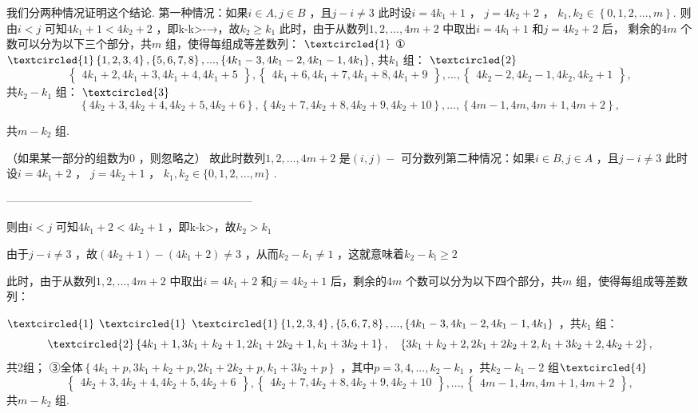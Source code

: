 \begin{question}
{我们分两种情况证明这个结论. 第一种情况：如果$i\in A,j\in B$ ，且$j-i\neq3$ 此时设$i=4k_{1}+1$ ， $j=4k_{2}+2$ ， $k_1,k_2\in\left\{0,1,2,...,m\right\}.$ 则由$i<j$ 可知$4k_{1}+1<4k_{2}+2$ ，即k-k>-→，故$k_2\geq k_1$ 此时，由于从数列$1,2,...,4m+2$ 中取出$i=4k_{\mathrm{l}}+1$ 和$j=4k_{2}+2$ 后， 剩余的$4m$ 个数可以分为以下三个部分，共$m$ 组，使得每组成等差数列： $\textcircled{1}$ ① $\textcircled{1}\left\{1,2,3,4\right\},\left\{5,6,7,8\right\},...,\left\{4k_{1}-3,4k_{1}-2,4k_{1}-1,4k_{1}\right\}$, 共$k_1$ 组： $\textcircled{2}$
$$\begin{Bmatrix}4k_1+2,4k_1+3,4k_1+4,4k_1+5\end{Bmatrix},\begin{Bmatrix}4k_1+6,4k_1+7,4k_1+8,4k_1+9\end{Bmatrix},...,\begin{Bmatrix}4k_2-2,4k_2-1,4k_2,4k_2+1\end{Bmatrix},$$
共$k_2-k_1$ 组： $\textcircled{3}$
$$\left\{4k_2+3,4k_2+4,4k_2+5,4k_2+6\right\},\left\{4k_2+7,4k_2+8,4k_2+9,4k_2+10\right\},...,\left\{4m-1,4m,4m+1,4m+2\right\},$$

共$m-k_2$ 组.

（如果某一部分的组数为0 ，则忽略之） 故此时数列$1,2,...,4m+2$ 是$(i,j)-$ 可分数列第二种情况：如果$i\in B,j\in A$ ，且$j-i\neq3$ 此时设$i=4k_{1}+2$ ， $j=4k_{2}+1$ ， $k_1, k_2\in \{ 0, 1, 2, . . . , m\}$ .

------------------------------------------------------------------

则由$i<j$ 可知$4k_{1}+2<4k_{2}+1$ ，即k-k>，故$k_2>k_1$

由于$j-i\neq3$ ，故$\left(4k_{2}+1\right)-\left(4k_{1}+2\right)\neq3$ ，从而$k_2-k_1\neq1$ ，这就意味着$k_{2}-k_{\mathrm{l}}\geq2$

此时，由于从数列$1,2,...,4m+2$ 中取出$i=4k_{1}+2$ 和$j=4k_{2}+1$ 后，剩余的$4m$ 个数可以分为以下四个部分，共$m$ 组，使得每组成等差数列：

$\textcircled{1}$ $\textcircled{1}$ $\textcircled{1}\left\{1,2,3,4\right\},\left\{5,6,7,8\right\},...,\left\{4k_{1}-3,4k_{1}-2,4k_{1}-1,4k_{1}\right\}$ ，共$k_1$ 组：
$$\textcircled{2}\left\{4k_1+1,3k_1+k_2+1,2k_1+2k_2+1,k_1+3k_2+1\right\},\quad\left\{3k_1+k_2+2,2k_1+2k_2+2,k_1+3k_2+2,4k_2+2\right\},$$
共2组； ③全体$\left\{4k_{1}+p,3k_{1}+k_{2}+p,2k_{1}+2k_{2}+p,k_{1}+3k_{2}+p\right\}$ ，其中$p=3,4,...,k_{2}-k_{1}$ ，共$k_{2}-k_{1}-2$ 组$\textcircled{4}$
$$\begin{Bmatrix}4k_2+3,4k_2+4,4k_2+5,4k_2+6\end{Bmatrix},\begin{Bmatrix}4k_2+7,4k_2+8,4k_2+9,4k_2+10\end{Bmatrix},...,\begin{Bmatrix}4m-1,4m,4m+1,4m+2\end{Bmatrix},$$
共$m-k_2$ 组.

}
\end{question}
